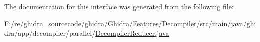 The documentation for this interface was generated from the following file\+:\begin{DoxyCompactItemize}
\item 
F\+:/re/ghidra\+\_\+sourcecode/ghidra/\+Ghidra/\+Features/\+Decompiler/src/main/java/ghidra/app/decompiler/parallel/\mbox{\hyperlink{_decompiler_reducer_8java}{Decompiler\+Reducer.\+java}}\end{DoxyCompactItemize}
